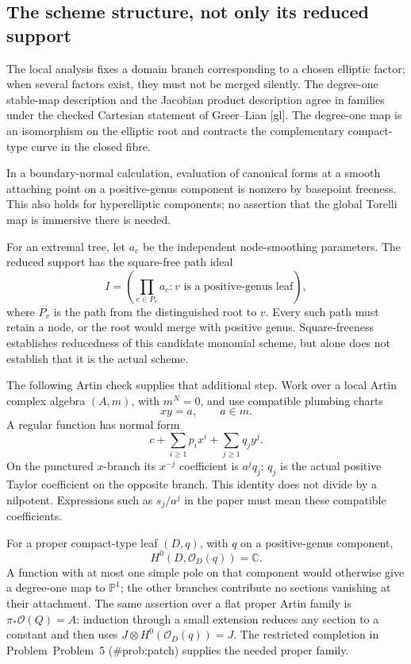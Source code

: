 \documentclass[10pt]{article}
\begin{document}
\subsection*{The scheme structure, not only its reduced support}
The local analysis fixes a domain branch corresponding to a chosen elliptic factor; when several factors exist, they must not be merged silently. The degree-one stable-map description and the Jacobian product description agree in families under the checked Cartesian statement of Greer–Lian [gl]. The degree-one map is an isomorphism on the elliptic root and contracts the complementary compact-type curve in the closed fibre.\par
In a boundary-normal calculation, evaluation of canonical forms at a smooth attaching point on a positive-genus component is nonzero by basepoint freeness. This also holds for hyperelliptic components; no assertion that the global Torelli map is immersive there is needed.\par
For an extremal tree, let \(a_e\) be the independent node-smoothing parameters. The reduced support has the square-free path ideal \[I=\left(\prod_{e\in P_v}a_e:
                   v\text{ is a positive-genus leaf}\right),\] where \(P_v\) is the path from the distinguished root to \(v\). Every such path must retain a node, or the root would merge with positive genus. Square-freeness establishes reducedness of this candidate monomial scheme, but alone does not establish that it is the actual scheme.\par
The following Artin check supplies that additional step. Work over a local Artin complex algebra \((A,m)\), with \(m^N=0\), and use compatible plumbing charts \[xy=a,\qquad a\in m.\] A regular function has normal form \[c+\sum_{i\ge1}p_i x^i+\sum_{j\ge1}q_j y^j.\] On the punctured \(x\)-branch its \(x^{-j}\) coefficient is \(a^j q_j\); \(q_j\) is the actual positive Taylor coefficient on the opposite branch. This identity does not divide by a nilpotent. Expressions such as \(s_j/a^j\) in the paper must mean these compatible coefficients.\par
For a proper compact-type leaf \((D,q)\), with \(q\) on a positive-genus component, \[H^0(D,\mathcal O_D(q))=\mathbb C.\] A function with at most one simple pole on that component would otherwise give a degree-one map to \(\mathbb P^1\); the other branches contribute no sections vanishing at their attachment. The same assertion over a flat proper Artin family is \(\pi_*\mathcal O(Q)=A\): induction through a small extension reduces any section to a constant and then uses \(J\otimes H^0(\mathcal O_D(q))=J\). The restricted completion in Problem Problem 5 (\#prob:patch) supplies the needed proper family.\par
\end{document}
